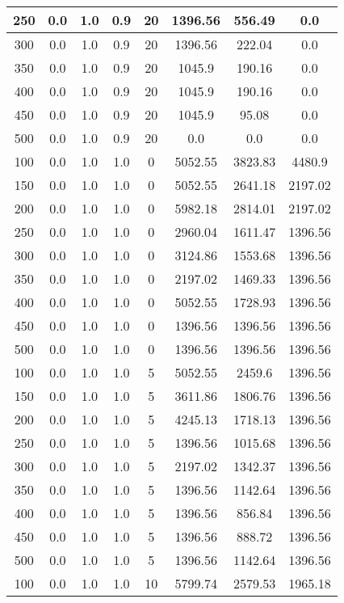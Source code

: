 \documentclass[a4paper, 12pt]{extreport}
\begin{document}
\begin{itemize}
\begin{longtable}{|c|c|c|c|c|c|c|c|}
			250 & 0.0 & 1.0 & 0.9 & 20 & 1396.56 & 556.49 & 0.0 \\\hline
			300 & 0.0 & 1.0 & 0.9 & 20 & 1396.56 & 222.04 & 0.0 \\\hline
			350 & 0.0 & 1.0 & 0.9 & 20 & 1045.9 & 190.16 & 0.0 \\\hline
			400 & 0.0 & 1.0 & 0.9 & 20 & 1045.9 & 190.16 & 0.0 \\\hline
			450 & 0.0 & 1.0 & 0.9 & 20 & 1045.9 & 95.08 & 0.0 \\\hline
			500 & 0.0 & 1.0 & 0.9 & 20 & 0.0 & 0.0 & 0.0 \\\hline
			100 & 0.0 & 1.0 & 1.0 & 0 & 5052.55 & 3823.83 & 4480.9 \\\hline
			150 & 0.0 & 1.0 & 1.0 & 0 & 5052.55 & 2641.18 & 2197.02 \\\hline
			200 & 0.0 & 1.0 & 1.0 & 0 & 5982.18 & 2814.01 & 2197.02 \\\hline
			250 & 0.0 & 1.0 & 1.0 & 0 & 2960.04 & 1611.47 & 1396.56 \\\hline
			300 & 0.0 & 1.0 & 1.0 & 0 & 3124.86 & 1553.68 & 1396.56 \\\hline
			350 & 0.0 & 1.0 & 1.0 & 0 & 2197.02 & 1469.33 & 1396.56 \\\hline
			400 & 0.0 & 1.0 & 1.0 & 0 & 5052.55 & 1728.93 & 1396.56 \\\hline
			450 & 0.0 & 1.0 & 1.0 & 0 & 1396.56 & 1396.56 & 1396.56 \\\hline
			500 & 0.0 & 1.0 & 1.0 & 0 & 1396.56 & 1396.56 & 1396.56 \\\hline
			100 & 0.0 & 1.0 & 1.0 & 5 & 5052.55 & 2459.6 & 1396.56 \\\hline
			150 & 0.0 & 1.0 & 1.0 & 5 & 3611.86 & 1806.76 & 1396.56 \\\hline
			200 & 0.0 & 1.0 & 1.0 & 5 & 4245.13 & 1718.13 & 1396.56 \\\hline
			250 & 0.0 & 1.0 & 1.0 & 5 & 1396.56 & 1015.68 & 1396.56 \\\hline
			300 & 0.0 & 1.0 & 1.0 & 5 & 2197.02 & 1342.37 & 1396.56 \\\hline
			350 & 0.0 & 1.0 & 1.0 & 5 & 1396.56 & 1142.64 & 1396.56 \\\hline
			400 & 0.0 & 1.0 & 1.0 & 5 & 1396.56 & 856.84 & 1396.56 \\\hline
			450 & 0.0 & 1.0 & 1.0 & 5 & 1396.56 & 888.72 & 1396.56 \\\hline
			500 & 0.0 & 1.0 & 1.0 & 5 & 1396.56 & 1142.64 & 1396.56 \\\hline
			100 & 0.0 & 1.0 & 1.0 & 10 & 5799.74 & 2579.53 & 1965.18 \\\hline

\end{longtable}
\end{itemize}
\end{document}
